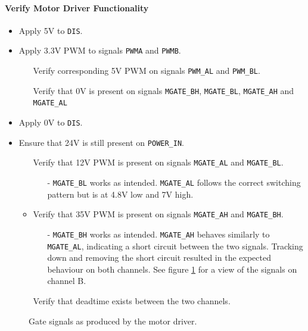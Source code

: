 \paragraph{Verify Motor Driver Functionality} %
\label{par:verify_motor_driver_functionality}
\begin{itemize}
	\item Apply 5V to \texttt{DIS}.
	\item Apply 3.3V PWM to signals \texttt{PWMA} and \texttt{PWMB}.
	\begin{itemize}
		\item[\cmark] Verify corresponding 5V PWM on signals \texttt{PWM\_AL} and \texttt{PWM\_BL}.
		\item[\cmark] Verify that 0V is present on signals \texttt{MGATE\_BH}, \texttt{MGATE\_BL}, \texttt{MGATE\_AH} and \texttt{MGATE\_AL}
	\end{itemize}
	\item Apply 0V to \texttt{DIS}.
	\item Ensure that 24V is still present on \texttt{POWER\_IN}.
	\begin{itemize}
		\item[\xmark] Verify that 12V PWM is present on signals \texttt{MGATE\_AL} and \texttt{MGATE\_BL}.
		\begin{itemize}
			\item[-] \texttt{MGATE\_BL} works as intended.
			\texttt{MGATE\_AL} follows the correct switching pattern but is at 4.8V low and 7V high.  
		\end{itemize}
		\item Verify that 35V PWM is present on signals \texttt{MGATE\_AH} and \texttt{MGATE\_BH}.
		\begin{itemize}
			\item [-] \texttt{MGATE\_BH} works as intended.
			\texttt{MGATE\_AH} behaves similarly to \texttt{MGATE\_AL}, indicating a short circuit between the two signals.
			Tracking down and removing the short circuit resulted in the expected behaviour on both channels.
			See figure \ref{fig:controllerboardv2_gate_b} for a view of the signals on channel B.
		\end{itemize}
		\item[\cmark] Verify that deadtime exists between the two channels.
	\end{itemize}
\end{itemize}

\begin{figure}[h]
	\centering
    
	\caption{Gate signals as produced by the motor driver.}
	\label{fig:controllerboardv2_gate_b}
\end{figure}

